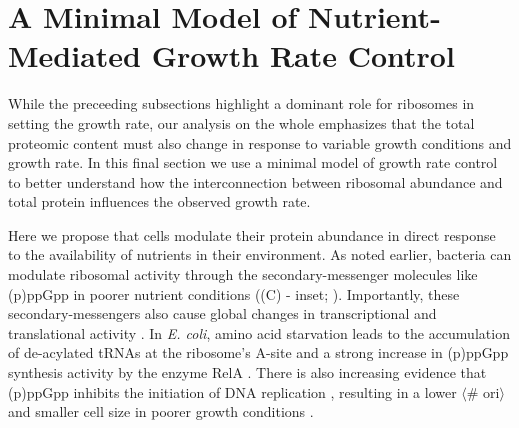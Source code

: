 \section{A Minimal Model of Nutrient-Mediated Growth Rate Control}
While the preceeding subsections highlight a dominant role for ribosomes in
setting the growth rate, our analysis on the whole emphasizes that the total
proteomic content must also change in response to variable growth conditions and
growth rate. In this final section we use a minimal model of growth rate control
to better understand how the interconnection between ribosomal abundance and
total protein influences the observed growth rate.

Here we propose that cells modulate their protein abundance in direct
response to the availability of nutrients in their environment. As noted earlier,
bacteria can modulate ribosomal activity through the secondary-messenger
molecules like (p)ppGpp in poorer nutrient conditions ((C) -
inset; \cite{dai2016}). Importantly, these secondary-messengers also cause global changes in
transcriptional and translational activity \citep{hauryliuk2015, zhu2019,
Buke2020}. In \textit{E. coli}, amino acid starvation leads to the accumulation of
de-acylated tRNAs at the ribosome's A-site and a strong increase in
(p)ppGpp synthesis activity by the enzyme RelA \citep{hauryliuk2015}. There is
also increasing evidence that (p)ppGpp inhibits the initiation of DNA
replication \citep{kraemer2019}, resulting in a lower $\langle$\# ori$\rangle$
 and smaller cell size in poorer growth conditions \citep{fernandezcoll2020}.


%



